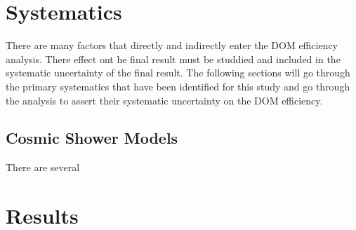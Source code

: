 \documentclass[a4paper,onecolumn, 12pt]{article}
\begin{document}
\section{Systematics}
There are many factors that directly and indirectly enter the DOM efficiency analysis. There effect ont he final result must be studdied and included in the systematic uncertainty of the final result. The following sections will go through the primary systematics that have been identified for this study and go through the analysis to assert their systematic uncertainty on the DOM efficiency. 


\subsection{Cosmic Shower Models}
There are several 

\section{Results}
\end{document}
